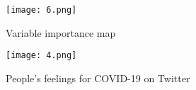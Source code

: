 \documentclass[12pt,english]{article}
\begin{document}
\begin{figure}
\centering
\bigskip{}
\texttt{[image: 6.png]}
\caption{Variable importance map}
\label{fig:fig1}
\end{figure}

\newpage




\begin{figure}
\centering
\bigskip{}
\texttt{[image: 4.png]}
\caption{People's feelings for COVID-19 on Twitter}
\label{fig:fig1}
\end{figure}

\newpage
\end{document}
